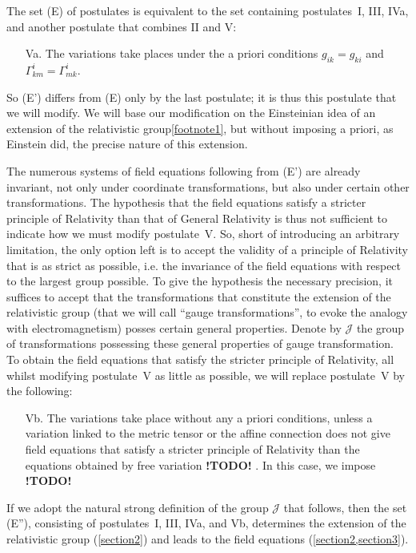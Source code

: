 \documentclass{article}
\theoremstyle{plain}
\theoremstyle{definition}
\newcommand{\JJ}{\mathcal{J}}
\newcommand{\todo}{\textbf{ !TODO! }}
\newcommand{\oldpage}[1]{\marginpar{\footnotesize$\Big\vert$ \textit{p.~#1}}}
\begin{document}
The set (E) of postulates is equivalent to the set containing postulates~I, III, IVa, and another postulate that combines II and V:
\begin{enumerate}
  \item[Va.] The variations take places under the a priori conditions $g_{ik}=g_{ki}$ and $\Gamma_{km}^i=\Gamma_{mk}^i$.
\end{enumerate}

So (E') differs from (E) only by the last postulate; it is thus this postulate that we will modify.
We will base our modification on the Einsteinian idea of an extension of the relativistic group\cref{footnote1}, but without imposing a priori, as Einstein did, the precise nature of this extension.

The numerous systems of field equations following from (E') are already invariant, not only under coordinate transformations, but also under certain other transformations.
The hypothesis that the field equations satisfy a stricter principle of Relativity than that of General Relativity is thus not sufficient to indicate how we must modify postulate~V.
So, short of introducing an arbitrary limitation, the only option left is to accept the validity of a principle of Relativity
\oldpage{10-03}
that is as strict as possible, i.e. the invariance of the field equations with respect to the largest group possible.
To give the hypothesis the necessary precision, it suffices to accept that the transformations that constitute the extension of the relativistic group (that we will call ``gauge transformations'', to evoke the analogy with electromagnetism) posses certain general properties.
Denote by $\JJ$ the group of transformations possessing these general properties of gauge transformation.
To obtain the field equations that satisfy the stricter principle of Relativity, all whilst modifying postulate~V as little as possible, we will replace postulate~V by the following:
\begin{enumerate}
  \item[Vb.] The variations take place without any a priori conditions, unless a variation linked to the metric tensor or the affine connection does not give field equations that satisfy a stricter principle of Relativity than the equations obtained by free variation\todo.
    In this case, we impose \todo
\end{enumerate}

If we adopt the natural strong definition of the group $\JJ$ that follows, then the set (E''), consisting of postulates~I, III, IVa, and Vb, determines the extension of the relativistic group (\cref{section2}) and leads to the field equations (\cref{section2,section3}).
\end{document}
